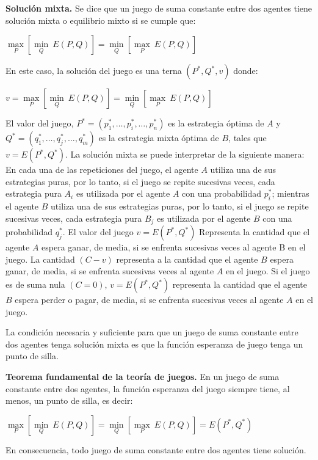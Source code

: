 \begin{definicion}
\textbf{Solución mixta.}
Se dice que un juego de suma constante entre dos agentes tiene solución mixta o equilibrio mixto si se cumple que:
\begin{center}
    $ \underset{P}{\max}\left[ \underset{Q}{\min} \: E(P,Q) \right] = \underset{Q}{\min}\left[ \underset{P}{\max} \: E(P,Q) \right] $
\end{center}
En este caso, la solución del juego es una terna $(P^*,Q^*,v)$ donde:
\begin{center}
    $ v = \underset{P}{\max}\left[ \underset{Q}{\min} \: E(P,Q) \right] = \underset{Q}{\min}\left[ \underset{P}{\max} \: E(P,Q) \right] $
\end{center}
El valor del juego, $P^* = (p_1^*,\ldots,p_i^*,\ldots,p_n^*)$ es la estrategia óptima de $A$ y $Q^* = (q_1^*,\ldots,q_j^*,\ldots,q_m^*)$ es la estrategia mixta óptima de $B$, tales que $v=E(P^*,Q^*)$.  La solución mixta se puede interpretar de la siguiente manera:
\\
En cada una de las repeticiones del juego, el agente $A$ utiliza una de sus estrategias puras, por lo tanto, si el juego se repite sucesivas veces, cada estrategia pura $A_i$ es utilizada por el agente $A$ con una probabilidad $p_i^*$; mientras el agente $B$ utiliza una de sus estrategias puras, por lo tanto, si el juego se repite sucesivas veces, cada estrategia pura $B_j$ es utilizada por el agente $B$ con una probabilidad $q_j^*$. El valor del juego $v=E(P^*,Q^*)$ Representa la cantidad que el agente $A$ espera ganar, de media, si se enfrenta sucesivas veces al agente B en el juego. La  cantidad $(C-v)$ representa a la cantidad que el agente $B$ espera ganar, de media, si se enfrenta sucesivas veces al agente $A$ en el juego. Si el juego es de suma nula $(C=0)$, $v = E(P^*,Q^*)$ representa la cantidad que el agente $B$ espera perder o pagar, de media, si se enfrenta sucesivas veces al agente $A$ en el juego.
\end{definicion}

\begin{proposicion}
La condición necesaria y suficiente para que un juego de suma constante entre dos agentes tenga solución mixta es que la función esperanza de juego tenga un punto de silla.
\end{proposicion}

\begin{theorem}
\textbf{Teorema fundamental de la teoría de juegos.}
En un juego de suma constante entre dos agentes, la función esperanza del juego siempre tiene, al menos, un punto de silla, es decir:
\begin{center}
    $\underset{P}{\max}\left[ \underset{Q}{\min} \: E(P,Q) \right] = \underset{Q}{\min}\left[ \underset{P}{\max} \: E(P,Q) \right] = E(P^*,Q^*)$
\end{center}
En consecuencia, todo juego de suma constante entre dos agentes tiene solución.
\end{theorem}

